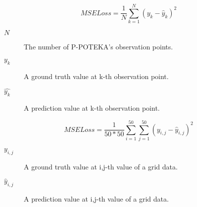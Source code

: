 \documentclass[fleqn]{article}
\begin{document}
\begin{equation}
  MSE Loss = \frac{1}{N} \sum_{k=1}^{N}(y_k - \widehat{y}_k)^{2}
\end{equation}
\begin{description}
  \item[$N$] The number of P-POTEKA's observation points.
  \item[$y_k$] A ground truth value at k-th observation point.
  \item[$\widehat{y_k}$] A prediction value at k-th observation point.
\end{description}

\begin{equation}
  MSE Loss = \frac{1}{50*50} \sum_{i=1}^{50}\sum_{j=1}^{50} (y_{i,j} - \widehat{y}_{i,j})^{2}
\end{equation}
\begin{description}
  \item[$y_{i,j}$] A ground truth value at i,j-th value of a grid data.
  \item[$\widehat{y}_{i,j}$] A prediction value at i,j-th value of a grid data.
\end{description}
\end{document}
